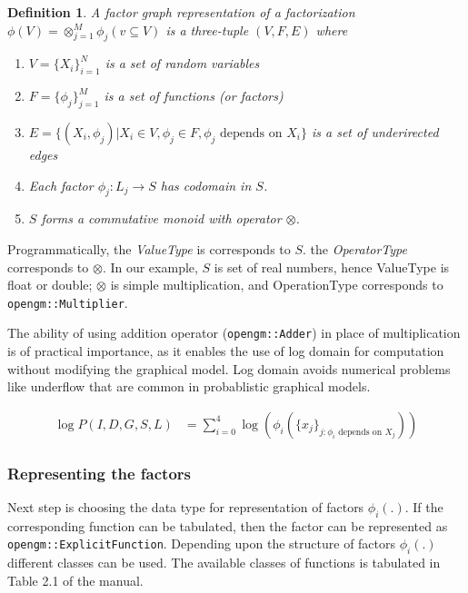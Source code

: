 \documentclass[12pt,oneside,letterpaper]{article}
\newtheorem{definition}{Definition}
\begin{document}
\begin{definition}
A \emph{factor graph} representation of a factorization 
$\phi(V) = \otimes_{j=1}^M \phi_j(v \subseteq V)$ 
is a three-tuple $(V, F, E)$ where 
\begin{enumerate}
   \item $V = \{X_i\}_{i=1}^{N}$ is a set of random variables 
   \item $F = \{\phi_j\}_{j=1}^{M}$ is a set of functions (or factors)
   \item $E = \{(X_i, \phi_j) | X_i \in V, \phi_j \in F, \phi_j \text{ depends on } X_i\}$ is a set of underirected edges
   \item Each factor $\phi_j : L_j \rightarrow S$ has codomain in $S$.
   \item $S$ forms a commutative monoid with operator $\otimes$.
\end{enumerate}
\end{definition}

Programmatically, the \emph{ValueType} is corresponds to $S$. the
\emph{OperatorType} corresponds to $\otimes$.  In our example, $S$ is set of real numbers, hence ValueType is float or double;
$\otimes$ is simple multiplication, and OperationType corresponds to
\lstinline|opengm::Multiplier|.


The ability of using addition operator (\lstinline|opengm::Adder|) in place
of multiplication is of practical importance, as it enables the use of log
domain for computation without modifying the graphical model. Log domain avoids
numerical problems like underflow that are common in probablistic graphical models.


\begin{align}
  \log P(I, D, G, S, L) &= \sum_{i=0}^{4} \log( \phi_i(\{ x_j \}_{j : \phi_i \text{ depends on } X_j}) )
  \label{eq:factorization}
\end{align}

\subsubsection{Representing the factors} 

Next step is choosing the data type for representation of factors $\phi_i(.)$.
If the corresponding function can be tabulated, then the factor can be
represented as \lstinline|opengm::ExplicitFunction|. Depending upon the structure of 
factors $\phi_i(.)$ different classes can be used. The available classes of
functions is tabulated in Table 2.1 of the manual.
\end{document}
